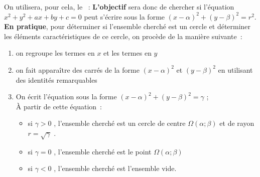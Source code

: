 
%
On utilisera, pour cela, le ~:
%
\textbf{L'objectif} sera donc de chercher si l'équation $x^2 +y^2 +ax+by+c=0 $ peut s'écrire sous la forme $\left(x- \alpha \right)^{2}+\left(y- \beta \right)^{2}=r^{2}$.
\medbreak
\textbf{En pratique}, pour déterminer si l'ensemble cherché est un cercle et déterminer les éléments caractéristiques de ce cercle, on procède de la manière suivante~:
\begin{enumerate}
     \item
     on regroupe les termes en  $x$ et les termes en $y$
     \item
     on fait apparaître des carrés de la forme $(x -  \alpha )^2 $ et $(y -  \beta )^2 $ en utilisant des identités remarquables
     \item
     On écrit l'équation sous la forme $(x- \alpha )^2 +(y -  \beta )^2 = \gamma $ ;\\
     À partir de cette équation~:
     \begin{itemize}
          \item
          si $ \gamma >0$ , l'ensemble cherché est un cercle de centre  $ \Omega ( \alpha ; \beta )$ et de rayon $r=\sqrt{ \gamma }$ .
          \item
          si $ \gamma =0$ , l'ensemble cherché est le point $ \Omega ( \alpha ; \beta )$
          \item
          si $ \gamma <0$ , l'ensemble cherché est l'ensemble vide.
     \end{itemize}
\end{enumerate}
